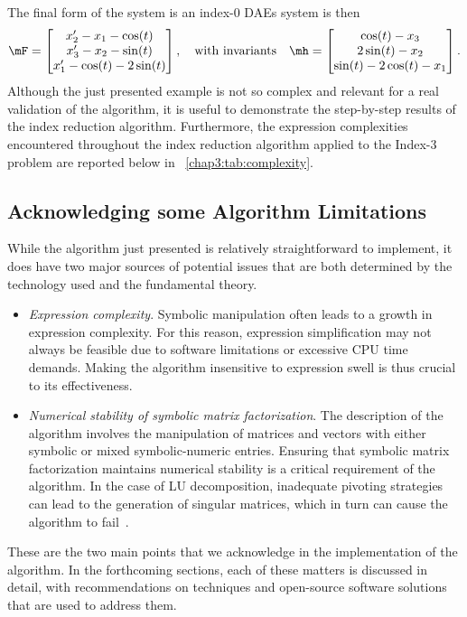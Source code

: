 %
The final form of the system is an index-0 \acp{DAE} system is then
%
\begin{equation}
  \label{chap3:eq:index_3_reduced}
  \mF = \begin{bmatrix}
    x^{\prime}_{2} - x_{1} - \cos(t) \\
    x^{\prime}_{3} - x_{2} - \sin(t) \\
    x^{\prime}_{1} - \cos(t) - 2\sin(t)
  \end{bmatrix},
  \quad \text{with invariants} \quad
  \mh = \begin{bmatrix}
    \cos(t) - x_{3} \\
    2\sin(t) - x_{2} \\
    \sin(t) - 2\cos(t) - x_{1}
  \end{bmatrix}.
\end{equation}
%
Although the just presented example is not so complex and relevant for a real validation of the algorithm, it is useful to demonstrate the step-by-step results of the index reduction algorithm. Furthermore, the expression complexities encountered throughout the index reduction algorithm applied to the Index-3 problem are reported below in \tablename{}~\ref{chap3:tab:complexity}.

\subsection{Acknowledging some Algorithm Limitations}

While the algorithm just presented is relatively straightforward to implement, it does have two major sources of potential issues that are both determined by the technology used and the fundamental theory.
%
\begin{itemize}
    \item \emph{Expression complexity}. Symbolic manipulation often leads to a growth in expression complexity. For this reason, expression simplification may not always be feasible due to software limitations or excessive CPU time demands. Making the algorithm insensitive to expression swell is thus crucial to its effectiveness.
    \item \emph{Numerical stability of symbolic matrix factorization}. The description of the algorithm involves the manipulation of matrices and vectors with either symbolic or mixed symbolic-numeric entries. Ensuring that symbolic matrix factorization maintains numerical stability is a critical requirement of the algorithm. In the case of \ac{LU} decomposition, inadequate pivoting strategies can lead to the generation of singular matrices, which in turn can cause the algorithm to fail~\cite{zhou2005implicit, zhou2007symbolic, giesbrecht2014symbolic}.
\end{itemize}
%
These are the two main points that we acknowledge in the implementation of the algorithm. In the forthcoming sections, each of these matters is discussed in detail, with recommendations on techniques and open-source software solutions that are used to address them.

